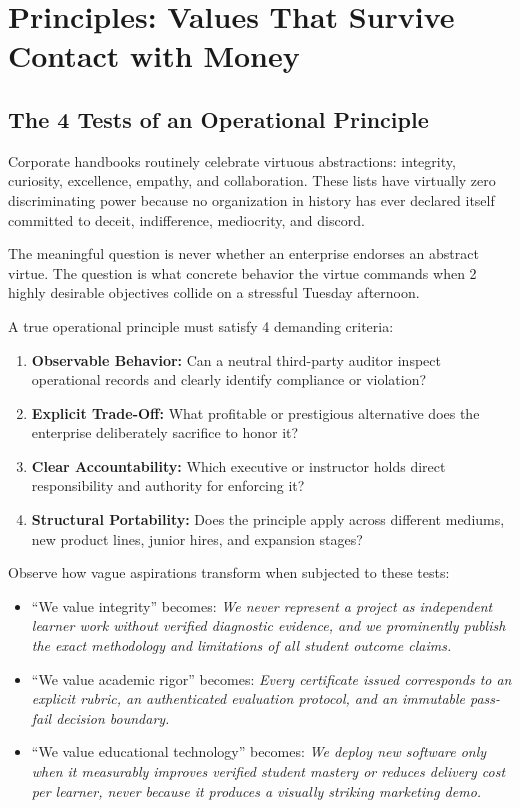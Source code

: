 \section{Principles: Values That Survive Contact with Money}

\subsection{The 4 Tests of an Operational Principle}

Corporate handbooks routinely celebrate virtuous abstractions: integrity, curiosity, excellence, empathy, and collaboration. These lists have virtually zero discriminating power because no organization in history has ever declared itself committed to deceit, indifference, mediocrity, and discord.

The meaningful question is never whether an enterprise endorses an abstract virtue. The question is what concrete behavior the virtue commands when 2 highly desirable objectives collide on a stressful Tuesday afternoon.

A true operational principle must satisfy 4 demanding criteria:

\begin{enumerate}[leftmargin=12pt,itemsep=2.5pt,topsep=1pt,parsep=0pt]
  \item \textbf{Observable Behavior:} Can a neutral third-party auditor inspect operational records and clearly identify compliance or violation?
  \item \textbf{Explicit Trade-Off:} What profitable or prestigious alternative does the enterprise deliberately sacrifice to honor it?
  \item \textbf{Clear Accountability:} Which executive or instructor holds direct responsibility and authority for enforcing it?
  \item \textbf{Structural Portability:} Does the principle apply across different mediums, new product lines, junior hires, and expansion stages?
\end{enumerate}

Observe how vague aspirations transform when subjected to these tests:

\begin{itemize}[leftmargin=11pt,itemsep=1.5pt,topsep=1.5pt,parsep=0pt]
  \item ``We value integrity'' becomes: \textit{We never represent a project as independent learner work without verified diagnostic evidence, and we prominently publish the exact methodology and limitations of all student outcome claims.}
  \item ``We value academic rigor'' becomes: \textit{Every certificate issued corresponds to an explicit rubric, an authenticated evaluation protocol, and an immutable pass-fail decision boundary.}
  \item ``We value educational technology'' becomes: \textit{We deploy new software only when it measurably improves verified student mastery or reduces delivery cost per learner, never because it produces a visually striking marketing demo.}
\end{itemize}


